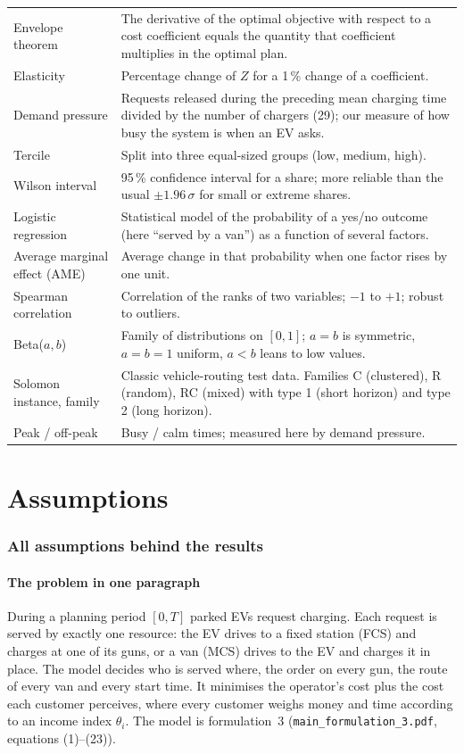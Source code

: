 \documentclass[11pt,a4paper]{article}
\newcommand{\pct}{\,\%}
\begin{document}
\begin{xltabular}{\textwidth}{@{}>{\raggedright\arraybackslash}p{4.0cm}X@{}}
Envelope theorem & The derivative of the optimal objective with respect to a cost coefficient equals the quantity that coefficient multiplies in the optimal plan. \\
Elasticity & Percentage change of $Z$ for a 1\pct{} change of a coefficient. \\
Demand pressure & Requests released during the preceding mean charging time divided by the number of chargers (29); our measure of how busy the system is when an EV asks. \\
Tercile & Split into three equal-sized groups (low, medium, high). \\
Wilson interval & 95\pct{} confidence interval for a share; more reliable than the usual $\pm1.96\,\sigma$ for small or extreme shares. \\
Logistic regression & Statistical model of the probability of a yes/no outcome (here ``served by a van'') as a function of several factors. \\
Average marginal effect (AME) & Average change in that probability when one factor rises by one unit. \\
Spearman correlation & Correlation of the ranks of two variables; $-1$ to $+1$; robust to outliers. \\
Beta($a,b$) & Family of distributions on $[0,1]$; $a=b$ is symmetric, $a=b=1$ uniform, $a<b$ leans to low values. \\
Solomon instance, family & Classic vehicle-routing test data. Families C (clustered), R (random), RC (mixed) with type 1 (short horizon) and type 2 (long horizon). \\
Peak / off-peak & Busy / calm times; measured here by demand pressure. \\
\bottomrule
\end{xltabular}

\clearpage
\part{Assumptions}
\section{All assumptions behind the results}
\label{sec:assumptions}

\subsection{The problem in one paragraph}
During a planning period $[0,T]$ parked EVs request charging. Each request is served by exactly one resource: the EV drives to a fixed station (FCS) and charges at one of its guns, or a van (MCS) drives to the EV and charges it in place. The model decides who is served where, the order on every gun, the route of every van and every start time. It minimises the operator's cost plus the cost each customer perceives, where every customer weighs money and time according to an income index $\theta_i$. The model is formulation~3 (\texttt{main\_formulation\_3.pdf}, equations (1)--(23)).
\end{document}
